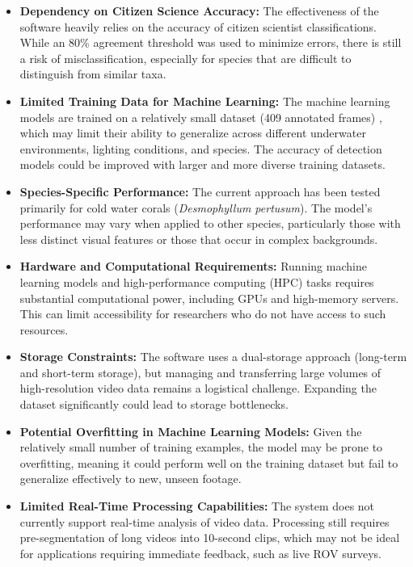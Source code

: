\begin{itemize}
    \item \textbf{Dependency on Citizen Science Accuracy:} The effectiveness of the software heavily relies on the accuracy of citizen scientist classifications. While an 80\% agreement threshold was used to minimize errors, there is still a risk of misclassification, especially for species that are difficult to distinguish from similar taxa.
    
    \item \textbf{Limited Training Data for Machine Learning:} The machine learning models are trained on a relatively small dataset (409 annotated frames) \cite{anton2021kso}, which may limit their ability to generalize across different underwater environments, lighting conditions, and species. The accuracy of detection models could be improved with larger and more diverse training datasets.
    
    \item \textbf{Species-Specific Performance:} The current approach has been tested primarily for cold water corals (\textit{Desmophyllum pertusum}). The model's performance may vary when applied to other species, particularly those with less distinct visual features or those that occur in complex backgrounds.
    
    \item \textbf{Hardware and Computational Requirements:} Running machine learning models and high-performance computing (HPC) tasks requires substantial computational power, including GPUs and high-memory servers. This can limit accessibility for researchers who do not have access to such resources.
    
    \item \textbf{Storage Constraints:} The software uses a dual-storage approach (long-term and short-term storage), but managing and transferring large volumes of high-resolution video data remains a logistical challenge. Expanding the dataset significantly could lead to storage bottlenecks.
    
    \item \textbf{Potential Overfitting in Machine Learning Models:} Given the relatively small number of training examples, the model may be prone to overfitting, meaning it could perform well on the training dataset but fail to generalize effectively to new, unseen footage.
    
    \item \textbf{Limited Real-Time Processing Capabilities:} The system does not currently support real-time analysis of video data. Processing still requires pre-segmentation of long videos into 10-second clips, which may not be ideal for applications requiring immediate feedback, such as live ROV surveys.


\end{itemize}
